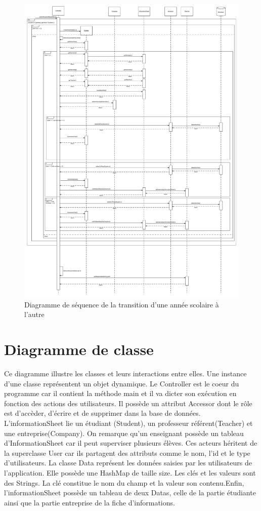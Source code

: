 \documentclass{scrreprt}
\begin{document}
\newpage
\begin{figure}[h]
\centering
\includegraphics[width=15cm]{images/newYearSeqDiag.png}
\caption{Diagramme de séquence de la transition d'une année scolaire à l'autre}
\end{figure}

\newpage
\chapter{Diagramme de classe}

Ce diagramme illustre les classes et leurs interactions entre elles. Une instance d'une classe représentent un objet dynamique. Le Controller est le coeur du programme car il contient la méthode main et il va dicter son exécution en fonction des actions des utilisateurs. Il possède un attribut Accessor dont le rôle est d'accèder, d'écrire et de supprimer dans la base de données. L'informationSheet lie un étudiant (Student), un professeur référent(Teacher) et une entreprise(Company). On remarque qu'un enseignant possède un tableau d'InformationSheet car il peut superviser plusieurs élèves. Ces acteurs héritent de la superclasse User car ils partagent des attributs comme le nom, l'id et le type d'utilisateurs. La classe Data représent les données saisies par les utilisateurs de l'application. Elle possède une HashMap de taille size. Les clés et les valeurs sont des Strings. La clé constitue le nom du champ et la valeur son contenu.Enfin, l'informationSheet possède un tableau de deux Datas, celle de la partie étudiante ainsi que la partie entreprise de la fiche d'informations.
\end{document}
